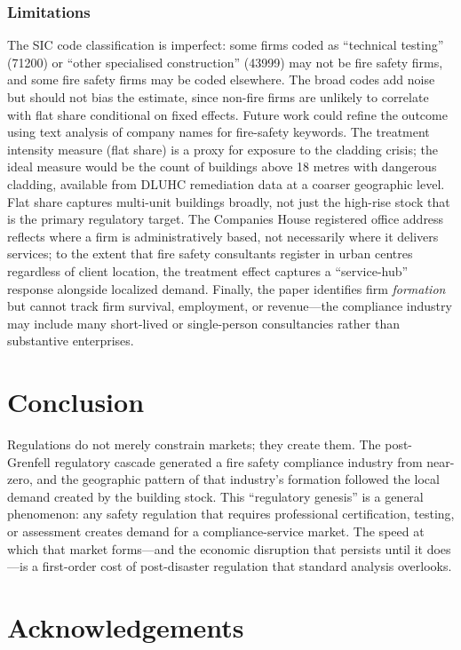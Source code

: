 \documentclass[12pt]{article}
\begin{document}
\subsubsection*{Limitations} The SIC code classification is imperfect: some firms coded as ``technical testing'' (71200) or ``other specialised construction'' (43999) may not be fire safety firms, and some fire safety firms may be coded elsewhere. The broad codes add noise but should not bias the estimate, since non-fire firms are unlikely to correlate with flat share conditional on fixed effects. Future work could refine the outcome using text analysis of company names for fire-safety keywords. The treatment intensity measure (flat share) is a proxy for exposure to the cladding crisis; the ideal measure would be the count of buildings above 18 metres with dangerous cladding, available from DLUHC remediation data at a coarser geographic level. Flat share captures multi-unit buildings broadly, not just the high-rise stock that is the primary regulatory target. The Companies House registered office address reflects where a firm is administratively based, not necessarily where it delivers services; to the extent that fire safety consultants register in urban centres regardless of client location, the treatment effect captures a ``service-hub'' response alongside localized demand. Finally, the paper identifies firm \textit{formation} but cannot track firm survival, employment, or revenue---the compliance industry may include many short-lived or single-person consultancies rather than substantive enterprises.


\section{Conclusion}

Regulations do not merely constrain markets; they create them. The post-Grenfell regulatory cascade generated a fire safety compliance industry from near-zero, and the geographic pattern of that industry's formation followed the local demand created by the building stock. This ``regulatory genesis'' is a general phenomenon: any safety regulation that requires professional certification, testing, or assessment creates demand for a compliance-service market. The speed at which that market forms---and the economic disruption that persists until it does---is a first-order cost of post-disaster regulation that standard analysis overlooks.


\section*{Acknowledgements}
\end{document}
